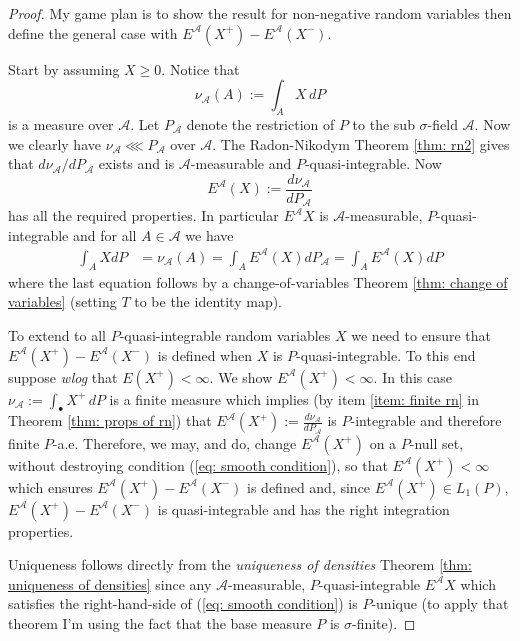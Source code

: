 \begin{proof}
My game plan is to show the result for non-negative random variables then define the general case with $E^{\mathcal A}(X^+) - E^{\mathcal A}(X^-)$.

Start by assuming $X\geq 0$. Notice that
\[
\nu_{\mathcal A}(A) := \int_A X\, dP
\]
is a measure over $\mathcal A$. Let $P_{\mathcal A}$ denote the restriction of $P$ to the sub $\sigma$-field $\mathcal A$. Now we clearly have   $\nu_{\mathcal A} \lll P_{\mathcal A}$ over $\mathcal A$.  The Radon-Nikodym Theorem \ref{thm: rn2} gives that $d\nu_{\mathcal A}/dP_{\mathcal A}$ exists and is $\mathcal A$-measurable and $P$-quasi-integrable. Now
\[
E^{\mathcal A}(X) := \frac{d\nu_{\mathcal A}}{dP_{\mathcal A}}
\]
 has all the required properties. In particular $E^{\mathcal A}X$ is $\mathcal A$-measurable, $P$-quasi-integrable and for all $A\in \mathcal A$ we have
\begin{align*}
\int_A XdP & = \nu_{\mathcal A}(A) =\int_A E^{\mathcal A}(X) dP_{\mathcal A}=\int_A E^{\mathcal A}(X) dP
\end{align*}
where the last equation  follows by a change-of-variables Theorem \ref{thm: change of variables} (setting $T$ to be the identity map).


To extend to all $P$-quasi-integrable  random variables $X$ we need to ensure that $E^{\mathcal A}(X^+) - E^{\mathcal A}(X^-)$ is defined when $X$ is $P$-quasi-integrable. To this end suppose {\sl wlog} that $E(X^+)<\infty$. We show  $E^{\mathcal A}(X^+)<\infty$. In this case $\nu_{\mathcal A} := \int_\bullet X^+\, dP $ is a finite measure which implies (by item \ref{item: finite rn} in Theorem \ref{thm: props of rn}) that $E^{\mathcal A}(X^+):= \frac{d\nu_{\mathcal A}}{dP_{\mathcal A}}$ is $P$-integrable and therefore finite $P$-a.e. Therefore, we may, and do, change $E^{\mathcal A}(X^+)$ on a $P$-null set, without destroying condition (\ref{eq: smooth condition}),  so that $E^{\mathcal A}(X^+)<\infty$ which ensures $E^{\mathcal A}(X^+) - E^{\mathcal A}(X^-)$ is defined and, since $E^{\mathcal A}(X^+)\in L_1(P)$, $E^{\mathcal A}(X^+) - E^{\mathcal A}(X^-)$ is quasi-integrable and has the right integration properties.

Uniqueness follows directly from the {\em uniqueness of densities} Theorem \ref{thm: uniqueness of densities} since any $\mathcal A$-measurable, $P$-quasi-integrable $E^{\mathcal A}X$ which satisfies the right-hand-side of (\ref{eq: smooth condition}) is $P$-unique (to apply that theorem I'm using the fact that the base measure $P$ is $\sigma$-finite).
\end{proof}

